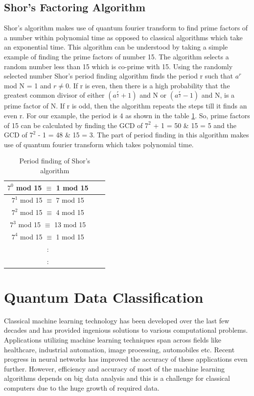 \documentclass[english,a4paper,11pt,oneside,onecolumn]{book}
\begin{document}
\subsection{Shor's Factoring Algorithm}
\label{sec:shorAlgo}
Shor's algorithm makes use of quantum fourier transform to find prime factors of a number within polynomial time as opposed to classical algorithms which take an exponential time. This algorithm can be understood by taking a simple example of finding the prime factors of number 15. The algorithm selects a random number less than 15 which is co-prime with 15. Using the randomly selected number Shor's period finding algorithm finds the period r such that \(a^r\) mod N = 1 and \(r \neq 0\). If r is even, then there is a high probability that the greatest common divisor of either \(\left(a^\frac{r}{2} + 1\right)\) and N or \(\left(a^\frac{r}{2} - 1\right)\) and N, is a prime factor of N. If r is odd, then the algorithm repeats the steps till it finds an even r. For our example, the period is 4 as shown in the table \ref{tab:shorPeriodFinding}. So, prime factors of 15 can be calculated by finding the GCD of \(7^2\) + 1 = 50 \& 15 = 5 and the GCD of \(7^2\) - 1 = 48 \& 15 = 3. The part of period finding in this algorithm makes use of quantum fourier transform which takes polynomial time.

\begin{table}[!h]
\begin{center}
\begin{tabular}{|c|c|c|}
\hline
\(7^0\) mod 15 $\equiv$ 1 mod 15\\
\hline
\(7^1\) mod 15 $\equiv$ 7 mod 15\\
\hline
\(7^2\) mod 15 $\equiv$ 4 mod 15\\
\hline
\(7^3\) mod 15 $\equiv$ 13 mod 15\\
\hline
\(7^4\) mod 15 $\equiv$ 1 mod 15\\
\hline
:\\
\hline
:\\
\hline
\end{tabular}
\end{center}
\caption{Period finding of Shor's algorithm} 
\label{tab:shorPeriodFinding}
\end{table}

\section{Quantum Data Classification}
\label{sec:qml}
Classical machine learning technology has been developed over the last few decades and has provided ingenious solutions to various computational problems. Applications utilizing machine learning techniques span across fields like healthcare, industrial automation, image processing, automobiles etc. Recent progress in neural networks has improved the accuracy of these applications even further. However, efficiency and accuracy of most of the machine learning algorithms depends on big data analysis and this is a challenge for classical computers due to the huge growth of required data.
\end{document}
